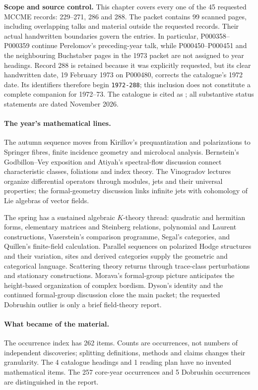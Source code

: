 \noindent\textbf{Scope and source control.}
This chapter covers every one of the 45 requested MCCME records: 229--271,
286 and 288.  The packet contains 99 scanned pages, including overlapping
talks and material outside the requested records.  Their actual handwritten
boundaries govern the entries.  In particular, P000358--P000359 continue
Perelomov's preceding-year talk, while P000450--P000451 and the neighbouring
Buchstaber pages in the 1973 packet are not assigned to year headings.
Record 288 is retained because it was explicitly requested, but its clear
handwritten date, 19 February 1973 on P000480, corrects the catalogue's 1972
date.  Its identifiers therefore begin \texttt{1972-288}; this inclusion does
not constitute a complete companion for 1972--73.  The catalogue is cited as
\citet{mccme2026gelfand}; all substantive status statements are dated November
2026.

\paragraph{The year's mathematical lines.}
The autumn sequence moves from Kirillov's prequantization and polarizations to
Springer fibres, finite incidence geometry and microlocal analysis.  Bernstein's
Godbillon--Vey exposition and Atiyah's spectral-flow discussion connect
characteristic classes, foliations and index theory.  The Vinogradov lectures
organize differential operators through modules, jets and their universal
properties; the formal-geometry discussion links infinite jets with
cohomology of Lie algebras of vector fields.

The spring has a sustained algebraic \(K\)-theory thread: quadratic and
hermitian forms, elementary matrices and Steinberg relations, polynomial and
Laurent constructions, Vaserstein's comparison programme, Segal's categories,
and Quillen's finite-field calculation.  Parallel sequences on polarized
Hodge structures and their variation, sites and derived categories supply the geometric
and categorical language.  Scattering theory returns through trace-class
perturbations and stationary constructions.  Morava's formal-group picture
anticipates the height-based organization of complex bordism.  Dyson's
identity and the continued formal-group discussion close the main packet;
the requested Dobrushin outlier is only a brief field-theory report.

\paragraph{What became of the material.}
The occurrence index has 262 items.  Counts are occurrences, not numbers
of independent discoveries; splitting definitions, methods and claims changes
their granularity.  The 4 catalogue headings and 1 reading
plan have no invented mathematical items.  The 257 core-year occurrences and 5
Dobrushin occurrences are distinguished in the report.


